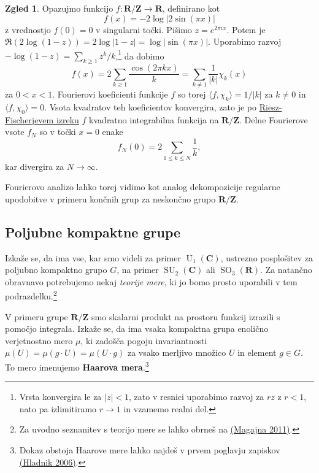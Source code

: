 \documentclass[11pt]{book}
\def\ZZ{\mathbf{Z}}
\def\RR{\mathbf{R}}
\def\CC{\mathbf{C}}
\DeclareMathOperator\SU{SU}
\DeclareMathOperator\U{U}
\DeclareMathOperator\SO{SO}
\def\definicija{\color{rdeca}\bf}
\theoremstyle{definition}
\theoremstyle{zgled}
\newtheorem{zgled}[theorem]{Zgled}
\theoremstyle{zgledbrezstevilke}
\theoremstyle{odprtproblem}
\theoremstyle{domacanaloga}
\theoremstyle{izrek}
\begin{document}
\begin{zgled}
Opazujmo funkcijo $f \colon \RR/\ZZ \to \RR$, definirano kot
\[
    f(x) = - 2 \log | 2 \sin(\pi x) |
\]
z vrednostjo $f(0) = 0$ v singularni točki. Pišimo $z = e^{2 \pi i x}$. Potem je $\Re(2 \log (1 - z)) = 2 \log |1 - z| = \log |\sin(\pi x)|$. Uporabimo razvoj $- \log(1 - z) = \sum_{k \geq 1} z^k / k$,\footnote{Vrsta konvergira le za $|z| < 1$, zato v resnici uporabimo razvoj za $r z$ z $r < 1$, nato pa izlimitiramo $r \to 1$ in vzamemo realni del.} da dobimo
\[
    f(x) = 
    2 \sum_{k \geq 1} \frac{\cos(2 \pi k x)}{k} 
    = \sum_{k \neq 1} \frac{1}{|k|} \chi_k(x)
\]
za $0 < x < 1$. Fourierovi koeficienti funkcije $f$ so torej $\langle f, \chi_k \rangle = 1/|k|$ za $k \neq 0$ in $\langle f, \chi_0 \rangle = 0$. Vsota kvadratov teh koeficientov konvergira, zato je po \href{https://en.wikipedia.org/wiki/Riesz–Fischer_theorem}{Riesz-Fischerjevem izreku} $f$ kvadratno integrabilna funkcija na $\RR/\ZZ$. Delne Fourierove vsote $f_N$ so v točki $x = 0$ enake 
\[
    f_N(0) = 2 \sum_{1 \leq k \leq N} \frac{1}{k},
\]
kar divergira za $N \to \infty$. 
\end{zgled}

Fourierovo analizo lahko torej vidimo kot analog dekompozicije regularne upodobitve v primeru končnih grup za neskončno grupo $\RR/\ZZ$.


\subsection{Poljubne kompaktne grupe}

Izkaže se, da ima vse, kar smo videli za primer $\U_1(\CC)$, ustrezno posplošitev za poljubno kompaktno grupo $G$, na primer $\SU_2(\CC)$ ali $\SO_3(\RR)$. Za natančno obravnavo potrebujemo nekaj \emph{teorije mere}, ki jo bomo prosto uporabili v tem podrazdelku.\footnote{Za uvodno seznanitev s teorijo mere se lahko obrneš na \href{https://www.fmf.uni-lj.si/sl/zalozba/katalog/46/osnove-teorije-mere/}{(Magajna 2011)}.} 

V primeru grupe $\RR/\ZZ$ smo skalarni produkt na prostoru funkcij izrazili s pomočjo integrala. Izkaže se, da ima vsaka kompaktna grupa enolično verjetnostno mero $\mu$, ki zadošča pogoju invariantnosti $\mu(U) = \mu(g \cdot U) = \mu(U \cdot g)$ za vsako merljivo množico $U$ in element $g \in G$. To mero imenujemo {\definicija Haarova mera}.\footnote{Dokaz obstoja Haarove mere lahko najdeš v prvem poglavju zapiskov \href{https://users.fmf.uni-lj.si/hladnik/3st/HA.pdf}{(Hladnik 2006)}.}
\end{document}
